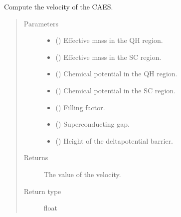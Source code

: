 \documentclass[letterpaper,10pt,english]{sphinxmanual}
\begin{document}
\begin{fulllineitems}
\label{\detokenize{modules:modules.functions.velocity}}
\pysigstartsignatures
{}
\pysigstopsignatures
\sphinxAtStartPar
Compute the velocity of the CAES.
\begin{quote}\begin{description}
\item[{Parameters}] \leavevmode\begin{itemize}
\item {} 
\sphinxAtStartPar
{} () \textendash{} Effective mass in the QH region.

\item {} 
\sphinxAtStartPar
{} () \textendash{} Effective mass in the SC region.

\item {} 
\sphinxAtStartPar
{} () \textendash{} Chemical potential in the QH region.

\item {} 
\sphinxAtStartPar
{} () \textendash{} Chemical potential in the SC region.

\item {} 
\sphinxAtStartPar
{} () \textendash{} Filling factor.

\item {} 
\sphinxAtStartPar
{} () \textendash{} Superconducting gap.

\item {} 
\sphinxAtStartPar
{} () \textendash{} Height of the delta\sphinxhyphen{}potential barrier.

\end{itemize}

\item[{Returns}] \leavevmode
\sphinxAtStartPar
The value of the velocity.

\item[{Return type}] \leavevmode
\sphinxAtStartPar
float

\end{description}\end{quote}

\end{fulllineitems}
\end{document}
